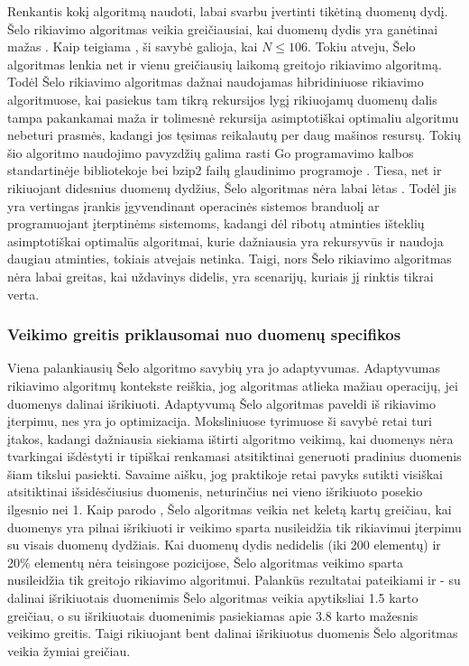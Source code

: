 \documentclass{VUMIFInfKursinis}
\begin{document}
Renkantis kokį algoritmą naudoti, labai svarbu įvertinti tikėtiną duomenų dydį.
Šelo rikiavimo algoritmas veikia greičiausiai, kai duomenų dydis yra ganėtinai mažas \cite{ciura2001best}.
Kaip teigiama \cite{simpson1999faster}, ši savybė galioja, kai $N \leq 106$.
Tokiu atveju, Šelo algoritmas lenkia net ir vienu greičiausių laikomą greitojo rikiavimo algoritmą.
Todėl Šelo rikiavimo algoritmas dažnai naudojamas hibridiniuose rikiavimo algoritmuose, kai pasiekus tam tikrą rekursijos lygį
rikiuojamų duomenų dalis tampa pakankamai maža ir tolimesnė rekursija asimptotiškai optimaliu algoritmu nebeturi prasmės,
kadangi jos tęsimas reikalautų per daug mašinos resursų.
Tokių šio algoritmo naudojimo pavyzdžių galima rasti Go programavimo kalbos standartinėje bibliotekoje \cite{golangsort} bei
bzip2 failų glaudinimo programoje \cite{bzip2sort}.
Tiesa, net ir rikiuojant didesnius duomenų dydžius, Šelo algoritmas nėra labai lėtas \cite{ciura2001best}.
Todėl jis yra vertingas įrankis įgyvendinant operacinės sistemos branduolį ar programuojant įterptinėms sistemoms, kadangi dėl ribotų atminties išteklių
asimptotiškai optimalūs algoritmai, kurie dažniausia yra rekursyvūs ir naudoja daugiau atminties, tokiais atvejais netinka.
Taigi, nors Šelo rikiavimo algoritmas nėra labai greitas, kai uždavinys didelis,
yra scenarijų, kuriais jį rinktis tikrai verta.

\subsubsection{Veikimo greitis priklausomai nuo duomenų specifikos}

Viena palankiausių Šelo algoritmo savybių yra jo adaptyvumas.
Adaptyvumas rikiavimo algoritmų kontekste reiškia, jog algoritmas atlieka mažiau operacijų, jei duomenys dalinai išrikiuoti.
Adaptyvumą Šelo algoritmas paveldi iš rikiavimo įterpimu, nes yra jo optimizacija.
Moksliniuose tyrimuose ši savybė retai turi įtakos, kadangi dažniausia siekiama ištirti algoritmo veikimą, kai duomenys
nėra tvarkingai išdėstyti ir tipiškai renkamasi atsitiktinai generuoti pradinius duomenis šiam tikslui pasiekti.
Savaime aišku, jog praktikoje retai pavyks sutikti visiškai atsitiktinai išsidėsčiusius duomenis, neturinčius nei vieno išrikiuoto posekio ilgesnio nei 1.
Kaip parodo \cite{10.1145/359024.359026}, Šelo algoritmas veikia net keletą kartų greičiau, kai duomenys yra pilnai
išrikiuoti ir veikimo sparta nusileidžia tik rikiavimui įterpimu su visais duomenų dydžiais.
Kai duomenų dydis nedidelis (iki 200 elementų) ir 20\% elementų nėra teisingose pozicijose, Šelo algoritmas veikimo sparta nusileidžia tik greitojo rikiavimo algoritmui.
Palankūs rezultatai pateikiami ir \cite{7280062} - su dalinai išrikiuotais duomenimis Šelo algoritmas veikia apytiksliai 1.5 karto greičiau, o su išrikiuotais
duomenimis pasiekiamas apie 3.8 karto mažesnis veikimo greitis.
Taigi rikiuojant bent dalinai išrikiuotus duomenis Šelo algoritmas veikia žymiai greičiau.
\end{document}
